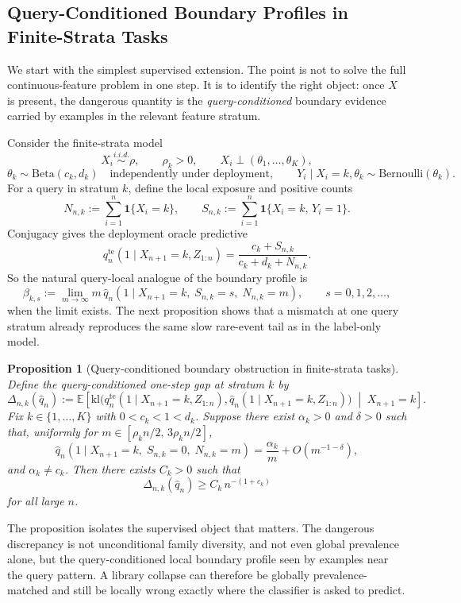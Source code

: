 \documentclass{article}
\newtheorem{proposition}[theorem]{Proposition}
\theoremstyle{definition}
\theoremstyle{remark}
\newcommand{\E}{\mathbb{E}}
\newcommand{\Ber}{\mathrm{Bernoulli}}
\newcommand{\BetaDist}{\mathrm{Beta}}
\newcommand{\ind}{\mathbf{1}}
\newcommand{\te}{\mathrm{te}}
\newcommand{\klb}{\mathrm{kl}}
\begin{document}
\subsection{Query-Conditioned Boundary Profiles in Finite-Strata Tasks}
\label{sec:stratified}

We start with the simplest supervised extension. The point is not to solve the full continuous-feature problem in one step. It is to identify the right object: once $X$ is present, the dangerous quantity is the \emph{query-conditioned} boundary evidence carried by examples in the relevant feature stratum.

Consider the finite-strata model
\[
X_i \stackrel{i.i.d.}{\sim} \rho,
\qquad
\rho_k>0,
\qquad
X_i\perp (\theta_1,\dots,\theta_K),
\]
\[
\theta_k \sim \BetaDist(c_k,d_k)
\quad\text{independently under deployment},
\qquad
Y_i\mid X_i=k,\theta_k \sim \Ber(\theta_k).
\]
For a query in stratum $k$, define the local exposure and positive counts
\[
N_{n,k}:=\sum_{i=1}^n \ind\{X_i=k\},
\qquad
S_{n,k}:=\sum_{i=1}^n \ind\{X_i=k,\,Y_i=1\}.
\]
Conjugacy gives the deployment oracle predictive
\[
q_n^{\te}(1\mid X_{n+1}=k,Z_{1:n})
=
\frac{c_k+S_{n,k}}{c_k+d_k+N_{n,k}}.
\]
So the natural query-local analogue of the boundary profile is
\[
\beta_{k,s}
:=
\lim_{m\to\infty}
m\,\hat q_n(1\mid X_{n+1}=k,\;S_{n,k}=s,\;N_{n,k}=m),
\qquad s=0,1,2,\dots,
\]
when the limit exists. The next proposition shows that a mismatch at one query stratum already reproduces the same slow rare-event tail as in the label-only model.

\begin{proposition}[Query-conditioned boundary obstruction in finite-strata tasks]
\label{prop:stratified-boundary}
Define the query-conditioned one-step gap at stratum $k$ by
\[
\Delta_{n,k}(\hat q_n)
:=
\E\!\left[
\klb\bigl(
q_n^{\te}(1\mid X_{n+1}=k,Z_{1:n}),
\hat q_n(1\mid X_{n+1}=k,Z_{1:n})
\bigr)
\;\middle|\;
X_{n+1}=k
\right].
\]
Fix $k\in\{1,\dots,K\}$ with $0<c_k<1<d_k$. Suppose there exist $\alpha_k>0$ and $\delta>0$ such that, uniformly for $m\in[\rho_k n/2,\,3\rho_k n/2]$,
\[
\hat q_n(1\mid X_{n+1}=k,\;S_{n,k}=0,\;N_{n,k}=m)
=
\frac{\alpha_k}{m}
+
O(m^{-1-\delta}),
\]
and $\alpha_k\neq c_k$. Then there exists $C_k>0$ such that
\[
\Delta_{n,k}(\hat q_n)\ge C_k\,n^{-(1+c_k)}
\]
for all large $n$.
\end{proposition}

The proposition isolates the supervised object that matters. The dangerous discrepancy is not unconditional family diversity, and not even global prevalence alone, but the query-conditioned local boundary profile seen by examples near the query pattern. A library collapse can therefore be globally prevalence-matched and still be locally wrong exactly where the classifier is asked to predict.
\end{document}
